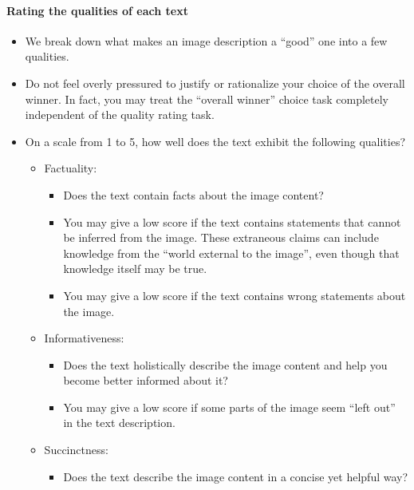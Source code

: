 \centering
\begin{tcolorbox}[
    colback=white,
    colframe=gray!20,
    arc=10pt,
    boxrule=1pt,
    title={\textcolor{white}{\textbf{Annotation Guidelines for the Sighted General Group (3/4)}}},
    coltitle=white,
    fonttitle=\large,
    colbacktitle=black!70,
]

\paragraph{Rating the qualities of each text}
\begin{itemize}
    \item We break down what makes an image description a “good” one into a few qualities.
    \item Do not feel overly pressured to justify or rationalize your choice of the overall winner. In fact, you may treat the “overall winner” choice task completely independent of the quality rating task.
    \item On a scale from 1 to 5, how well does the text exhibit the following qualities?
    \begin{itemize}
        \item Factuality:
        \begin{itemize}
            \item Does the text contain facts about the image content?
            \item You may give a low score if the text contains statements that cannot be inferred from the image. These extraneous claims can include knowledge from the “world external to the image”, even though that knowledge itself may be true.
            \item You may give a low score if the text contains wrong statements about the image.
        \end{itemize}
        \item Informativeness:
        \begin{itemize}
            \item Does the text holistically describe the image content and help you become better informed about it?
            \item You may give a low score if some parts of the image seem “left out” in the text description.
        \end{itemize}
        \item Succinctness:
        \begin{itemize}
            \item Does the text describe the image content in a concise yet helpful way?

\end{itemize}
\end{itemize}
\end{itemize}
\end{tcolorbox}
